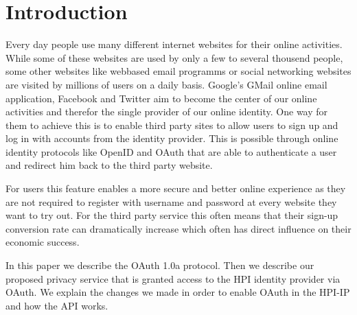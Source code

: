 \section{Introduction }
\label{sec:intro}

Every day people use many different internet websites for their online activities. While some of these websites are used by only a few to several thousend people, some other websites like webbased email programms or social networking websites are visited by millions of users on a daily basis. Google's GMail online email application, Facebook and Twitter aim to become the center of our online activities and therefor the single provider of our online identity. One way for them to achieve this is to enable third party sites to allow users to sign up and log in with accounts from the identity provider. This is possible through online identity protocols like OpenID and OAuth that are able to authenticate a user and redirect him back to the third party website.

For users this feature enables a more secure and better online experience as they are not required to register with username and password at every website they want to try out. For the third party service this often means that their sign-up conversion rate can dramatically increase which often has direct influence on their economic success.

In this paper we describe the OAuth 1.0a protocol. Then we describe our proposed privacy service that is granted access to the HPI identity provider via OAuth. We explain the changes we made in order to enable OAuth in the HPI-IP and how the API works.


